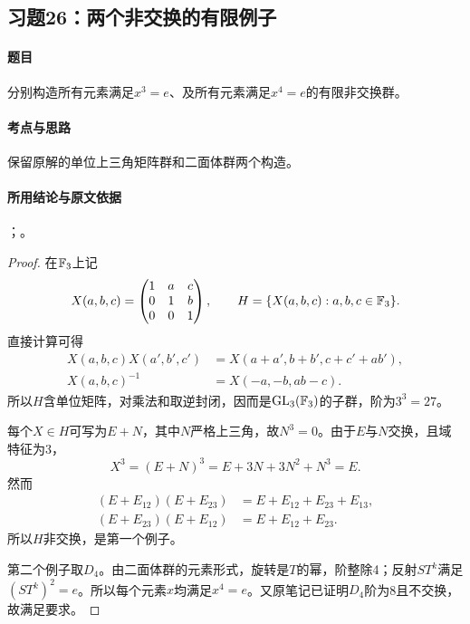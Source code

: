 \subsection{习题26：\texorpdfstring{两个非交换的有限例子}{两个非交换的有限例子}}
\label{ex:2:26}

\paragraph{题目}
分别构造所有元素满足$x^3=e$、及所有元素满足$x^4=e$的有限非交换群。

\paragraph{考点与思路}
保留原解的单位上三角矩阵群和二面体群两个构造。

\paragraph{所用结论与原文依据}
；。


\begin{proof}
在$\mathbb F_3$上记
\[
X(a,b,c)=\begin{pmatrix}1&a&c\\0&1&b\\0&0&1\end{pmatrix},\qquad
H=\{X(a,b,c):a,b,c\in\mathbb F_3\}.
\]
直接计算可得
\begin{align*}
X(a,b,c)X(a',b',c')&=X(a+a',b+b',c+c'+ab'),\\
X(a,b,c)^{-1}&=X(-a,-b,ab-c).
\end{align*}
所以$H$含单位矩阵，对乘法和取逆封闭，因而是$\operatorname{GL}_3(\mathbb F_3)$的子群，阶为$3^3=27$。

每个$X\in H$可写为$E+N$，其中$N$严格上三角，故$N^3=0$。由于$E$与$N$交换，且域特征为3，
\[
X^3=(E+N)^3=E+3N+3N^2+N^3=E.
\]
然而
\begin{align*}
(E+E_{12})(E+E_{23})&=E+E_{12}+E_{23}+E_{13},\\
(E+E_{23})(E+E_{12})&=E+E_{12}+E_{23}.
\end{align*}
所以$H$非交换，是第一个例子。

第二个例子取$D_4$。由二面体群的元素形式，旋转是$T$的幂，阶整除4；反射$ST^k$满足$(ST^k)^2=e$。所以每个元素$x$均满足$x^4=e$。又原笔记已证明$D_4$阶为8且不交换，故满足要求。
\end{proof}

